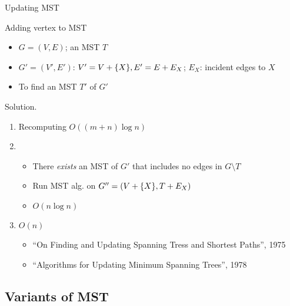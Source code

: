 \begin{frame}{Updating MST}
  \begin{exampleblock}{Adding vertex to MST }
    \begin{itemize}
      \item $G = (V,E)$; an MST $T$
      \item $G' = (V',E')$: $V' = V + \{X\}, E' = E + E_X$; $E_X$: incident
      edges to $X$
      \item To find an MST $T'$ of $G'$
    \end{itemize}
  \end{exampleblock}

  \begin{block}{Solution.}
    \begin{enumerate}
      \item Recomputing $O((m+n) \log n)$
      \item
        \begin{itemize}
          \item There \emph{exists} an MST of $G'$ that includes no edges in $G
          \setminus T$
          \item Run MST alg. on $G'' =(V + \{X\}, T + E_X)$
          \item $O(n \log n)$
        \end{itemize}
      \item $O(n)$
        \begin{itemize}
          \item ``On Finding and Updating Spanning Tress and Shortest Paths'', 1975
          \item ``Algorithms for Updating Minimum Spanning Trees'', 1978
        \end{itemize}
    \end{enumerate}
  \end{block}
\end{frame}
\subsection{Variants of MST}

